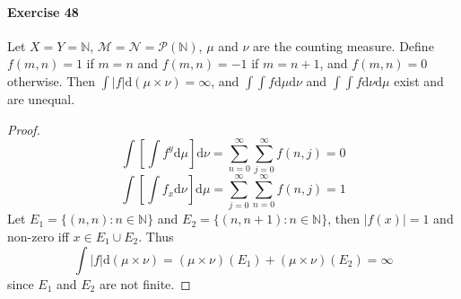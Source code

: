 \paragraph{Exercise 48}
Let $X=Y=\mathbb{N}$, $\mathcal{M}=\mathcal{N}=\mathcal{P}(\mathbb{N})$, $\mu$ and $\nu$ are the counting measure. Define $f(m,n)=1$ if $m=n$ and $f(m,n)=-1$ if $m=n+1$, and $f(m,n)=0$ otherwise. Then $\int|f|\mathrm{d}(\mu\times\nu)=\infty$, and $\int\int f\mathrm{d}\mu\mathrm{d}\nu$ and $\int\int f\mathrm{d}\nu\mathrm{d}\mu$ exist and are unequal.
\begin{proof}
    $$
    \int\left[\int f^y\mathrm{d}\mu\right]\mathrm{d}\nu=\sum^{\infty}_{n=0}\sum^{\infty}_{j=0}f(n,j)=0
    $$
    $$
    \int\left[\int f_x\mathrm{d}\nu\right]\mathrm{d}\mu=\sum^{\infty}_{j=0}\sum^{\infty}_{n=0}f(n,j)=1
    $$
    Let $E_1=\{(n,n):n\in\mathbb{N}\}$ and $E_2=\{(n,n+1):n\in\mathbb{N}\}$, then $|f(x)|=1$ and non-zero iff $x\in E_1\cup E_2$. Thus
    $$
    \int |f|\mathrm{d}(\mu\times\nu)=(\mu\times\nu)(E_1)+(\mu\times\nu)(E_2)=\infty
    $$
    since $E_1$ and $E_2$ are not finite.
\end{proof}
